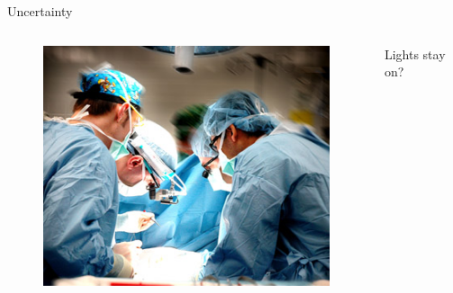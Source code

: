 \begin{frame}{Uncertainty }
\begin{columns}
\begin{figure}[ht]
\includegraphics[width=\textwidth]{images/surgery}
\end{figure}
Lights stay on?

\end{columns}

\end{frame}
